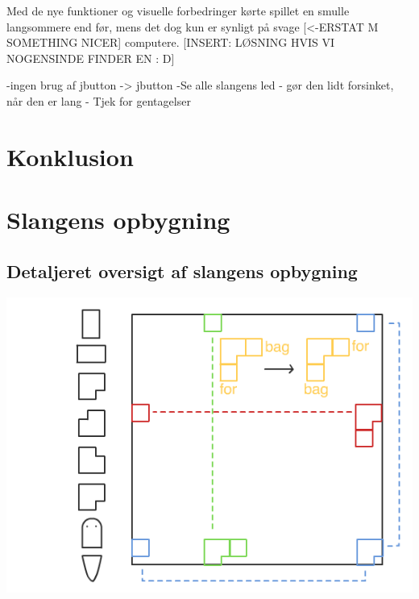 \documentclass{report}
\begin{document}
Med de nye funktioner og visuelle forbedringer kørte spillet en smulle langsommere end før, mens det dog kun er synligt på svage [<-ERSTAT M SOMETHING NICER] computere. [INSERT: LØSNING HVIS VI NOGENSINDE FINDER EN : D]

-ingen brug af jbutton -> jbutton
-Se alle slangens led - gør den lidt forsinket, når den er lang
- Tjek for gentagelser



\chapter{Konklusion}
\pagebreak

\appendix
{}
\chapter{Slangens opbygning}
\section{Detaljeret oversigt af slangens opbygning}
\graphicspath{ {pics/} }
\includegraphics[width=1\textwidth]{SnakeGraphic.png}
\end{document}
